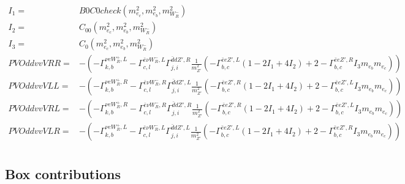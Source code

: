 \documentclass[A4,landscape]{article}
\begin{document}
\begin{align} 
I_1= & B0C0check(m^2_{e_{{c}}}, m^2_{e_{{b}}}, m^2_{W_R^-}) \\ 
I_2= & C_{00}(m^2_{e_{{c}}}, m^2_{e_{{b}}}, m^2_{W_R^-}) \\ 
I_3= & C_0(m^2_{e_{{c}}}, m^2_{e_{{b}}}, m^2_{W_R^-}) \\ 
  PVOddvvVRR= & -( - \Gamma^{\nu e W_R^+,L} _{k, b} - \Gamma^{\bar{e}\nu W_R^- ,L} _{c, l} \Gamma^{\bar{d}d {Z'} ,R}_{j, i} \frac{1}{m^2_{{Z'}}} (- \Gamma^{\bar{e}e {Z'} ,L} _{b, c} (1 - 2 I_1 + 4 I_2) + 2 - \Gamma^{\bar{e}e {Z'} ,R} _{b, c} I_3 m_{e_{{b}}} m_{e_{{c}}})) \\ 
  PVOddvvVLL= & -( - \Gamma^{\nu e W_R^+,R} _{k, b} - \Gamma^{\bar{e}\nu W_R^- ,R} _{c, l} \Gamma^{\bar{d}d {Z'} ,L}_{j, i} \frac{1}{m^2_{{Z'}}} (- \Gamma^{\bar{e}e {Z'} ,R} _{b, c} (1 - 2 I_1 + 4 I_2) + 2 - \Gamma^{\bar{e}e {Z'} ,L} _{b, c} I_3 m_{e_{{b}}} m_{e_{{c}}})) \\ 
  PVOddvvVRL= & -( - \Gamma^{\nu e W_R^+,R} _{k, b} - \Gamma^{\bar{e}\nu W_R^- ,R} _{c, l} \Gamma^{\bar{d}d {Z'} ,R}_{j, i} \frac{1}{m^2_{{Z'}}} (- \Gamma^{\bar{e}e {Z'} ,R} _{b, c} (1 - 2 I_1 + 4 I_2) + 2 - \Gamma^{\bar{e}e {Z'} ,L} _{b, c} I_3 m_{e_{{b}}} m_{e_{{c}}})) \\ 
  PVOddvvVLR= & -( - \Gamma^{\nu e W_R^+,L} _{k, b} - \Gamma^{\bar{e}\nu W_R^- ,L} _{c, l} \Gamma^{\bar{d}d {Z'} ,L}_{j, i} \frac{1}{m^2_{{Z'}}} (- \Gamma^{\bar{e}e {Z'} ,L} _{b, c} (1 - 2 I_1 + 4 I_2) + 2 - \Gamma^{\bar{e}e {Z'} ,R} _{b, c} I_3 m_{e_{{b}}} m_{e_{{c}}})) \\ 
\end{align} 
\subsection{Box contributions} 
\end{document}
